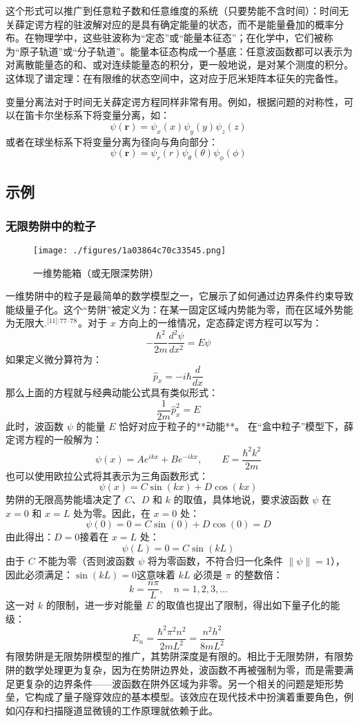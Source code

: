 这个形式可以推广到任意粒子数和任意维度的系统（只要势能不含时间）：时间无关薛定谔方程的驻波解对应的是具有确定能量的状态，而不是能量叠加的概率分布。在物理学中，这些驻波称为“定态”或“能量本征态”；在化学中，它们被称为“原子轨道”或“分子轨道”。能量本征态构成一个基底：任意波函数都可以表示为对离散能量态的和、或对连续能量态的积分，更一般地说，是对某个测度的积分。这体现了谱定理：在有限维的状态空间中，这对应于厄米矩阵本征矢的完备性。

变量分离法对于时间无关薛定谔方程同样非常有用。例如，根据问题的对称性，可以在笛卡尔坐标系下将变量分离，如：
$$
\psi(\mathbf{r}) = \psi_x(x) \psi_y(y) \psi_z(z)~
$$
或者在球坐标系下将变量分离为径向与角向部分：
$$
\psi(\mathbf{r}) = \psi_r(r) \psi_\theta(\theta) \psi_\phi(\phi)~
$$
\subsection{示例}
\subsubsection{无限势阱中的粒子}
\begin{figure}[ht]
\centering
\texttt{[image: ./figures/1a03864c70c33545.png]}
\caption{一维势能箱（或无限深势阱）} \label{fig_XDEfc_3}
\end{figure}
一维势阱中的粒子是最简单的数学模型之一，它展示了如何通过边界条件约束导致能级量子化。这个“势阱”被定义为：在某一固定区域内势能为零，而在区域外势能为无限大.\(^\text{[11]: 77–78 }\)。对于 $x$ 方向上的一维情况，定态薛定谔方程可以写为：
$$
-\frac{\hbar^2}{2m} \frac{d^2\psi}{dx^2} = E\psi~
$$
如果定义微分算符为：
$$
\hat{p}_x = -i\hbar \frac{d}{dx}~
$$
那么上面的方程就与经典动能公式具有类似形式：
$$
\frac{1}{2m} \hat{p}_x^2 = E~
$$
此时，波函数 $\psi$ 的能量 $E$ 恰好对应于粒子的**动能**。
在“盒中粒子”模型下，薛定谔方程的一般解为：
$$
\psi(x) = A e^{ikx} + B e^{-ikx}, \quad \quad E = \frac{\hbar^2 k^2}{2m}~
$$
也可以使用欧拉公式将其表示为三角函数形式：
$$
\psi(x) = C \sin(kx) + D \cos(kx)~
$$
势阱的无限高势能墙决定了 $C$、$D$ 和 $k$ 的取值，具体地说，要求波函数 $\psi$ 在 $x = 0$ 和 $x = L$ 处为零。因此，在 $x = 0$ 处：
$$
\psi(0) = 0 = C\sin(0) + D\cos(0) = D~
$$
由此得出：$D = 0$接着在 $x = L$ 处：
$$
\psi(L) = 0 = C\sin(kL)~
$$
由于 $C$ 不能为零（否则波函数 $\psi$ 将为零函数，不符合归一化条件 $\|\psi\| = 1$），因此必须满足：$\sin(kL) = 0$这意味着 $kL$ 必须是 $\pi$ 的整数倍：
$$
k = \frac{n\pi}{L}, \quad n = 1, 2, 3, \dots~
$$
这一对 $k$ 的限制，进一步对能量 $E$ 的取值也提出了限制，得出如下量子化的能级：
$$
E_n = \frac{\hbar^2 \pi^2 n^2}{2mL^2} = \frac{n^2 h^2}{8mL^2}~
$$
有限势阱是无限势阱模型的推广，其势阱深度是有限的。相比于无限势阱，有限势阱的数学处理更为复杂，因为在势阱边界处，波函数不再被强制为零，而是需要满足更复杂的边界条件——波函数在阱外区域为非零。另一个相关的问题是矩形势垒，它构成了量子隧穿效应的基本模型。该效应在现代技术中扮演着重要角色，例如闪存和扫描隧道显微镜的工作原理就依赖于此。
